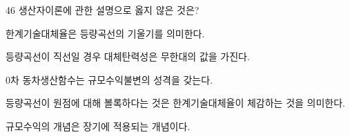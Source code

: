 \begin{question}{46}
생산자이론에 관한 설명으로 옳지 않은 것은?
\begin{choices}
  \item 한계기술대체율은 등량곡선의 기울기를 의미한다.
  \item 등량곡선이 직선일 경우 대체탄력성은 무한대의 값을 가진다.
  \item 0차 동차생산함수는 규모수익불변의 성격을 갖는다.
  \item 등량곡선이 원점에 대해 볼록하다는 것은 한계기술대체율이 체감하는 것을 의미한다.
  \item 규모수익의 개념은 장기에 적용되는 개념이다.
\end{choices}
\end{question}

